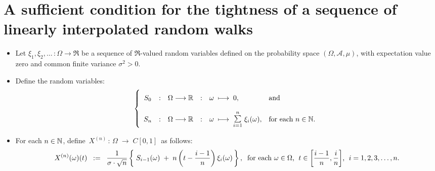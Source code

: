 

\section{A sufficient condition for the tightness of a sequence of linearly interpolated random walks}
\setcounter{theorem}{0}
\setcounter{equation}{0}

\renewcommand{\theenumi}{\roman{enumi}}
\renewcommand{\labelenumi}{\textnormal{(\theenumi)}$\;\;$}

\begin{lemma}
\label{tightnessRandomWalk}
\mbox{}\vskip 0.1cm
\begin{itemize}
\item	Let $\xi_{1}, \xi_{2}, \ldots\, : \Omega \longrightarrow \Re$ be a sequence of
		$\Re$-valued random variables
		defined on the probability space $(\Omega,\mathcal{A},\mu)$,
		with expectation value zero and common finite variance $\sigma^{2} > 0$.
\item	Define the random variables:
		\begin{equation*}
		\left\{\begin{array}{ccccll}
		S_{0}
		&:&\overset{{\color{white}1}}{\Omega} \longrightarrow \Re
		&:& \omega \;\longmapsto\; 0,
		& \textnormal{and}
		\\ \\
		S_{n}
		&:&	\Omega \longrightarrow \Re
		&:&	\omega \;\longmapsto\; \overset{n}{\underset{i=1}{\textnormal{\Large$\sum$}}}\;\xi_{i}(\omega),
		& \textnormal{for each $n \in \N$}.
		\end{array}\right.
		\end{equation*}
\item	For each $n \in \mathbb{N}$, define \,$X^{(n)} \,:\, \Omega \;\longrightarrow\;C[0,1]$\, as follows:
		\begin{equation*}
		X^{(n)}(\omega)(t)
		\;\; := \;\;
		\dfrac{1}{\sigma\cdot\sqrt{n}}
		\left\{\;
		S_{i-1}(\omega) \;+\; n\left(t - \dfrac{i-1}{n}\right)\xi_{i}(\omega)
		\,\right\},
		\;\;
		\textnormal{for each $\omega \in \Omega$, \;$t \in \left[\frac{i-1}{n},\frac{i}{n}\right]$, \;$i = 1,2,3,\ldots,n$}.
		\end{equation*}

\end{itemize}
\end{lemma}
